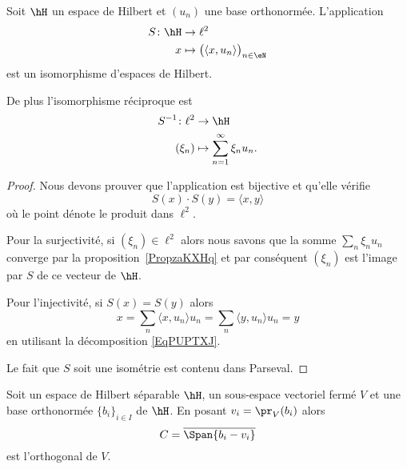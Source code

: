 \begin{corollary}       \label{CorQETwUdF}
	Soit \( \hH\) un espace de Hilbert et \( (u_n)\) une base orthonormée. L'application
	\begin{equation}
		\begin{aligned}
			S\colon \hH & \to \ell^2                                            \\
			x           & \mapsto \big( \langle x, u_n\rangle  \big)_{n\in \eN}
		\end{aligned}
	\end{equation}
	est un isomorphisme d'espaces de Hilbert.

	De plus l'isomorphisme réciproque est
	\begin{equation}
		\begin{aligned}
			S^{-1}\colon \ell^2 & \to \hH                              \\
			(\xi_n)             & \mapsto \sum_{n=1}^{\infty}\xi_nu_n.
		\end{aligned}
	\end{equation}
\end{corollary}

\begin{proof}
	Nous devons prouver que l'application est bijective et qu'elle vérifie
	\begin{equation}
		S(x)\cdot S(y)=\langle x, y\rangle
	\end{equation}
	où le point dénote le produit dans \( \ell^2\).

	Pour la surjectivité, si \( (\xi_n)\in \ell^2\) alors nous savons que la somme \( \sum_n\xi_nu_n\) converge par la proposition~\ref{PropzaKXHq} et par conséquent \( (\xi_n)\) est l'image par \( S\) de ce vecteur de \( \hH\).

	Pour l'injectivité, si \( S(x)=S(y)\) alors
	\begin{equation}
		x=\sum_n\langle x, u_n\rangle u_n=\sum_n\langle y, u_n\rangle u_n=y
	\end{equation}
	en utilisant la décomposition \eqref{EqPUPTXJ}.

	Le fait que \( S\) soit une isométrie est contenu dans Parseval.
\end{proof}

\begin{proposition}      \label{PROPooPVQIooPcEFSe}
	Soit un espace de Hilbert séparable \( \hH\), un sous-espace vectoriel fermé \( V\) et une base orthonormée \( \{ b_i \}_{i\in I}\) de \( \hH\). En posant \( v_i=\pr_V(b_i)\) alors
	\begin{equation}
		C=\overline{ \Span\{ b_i-v_i \} }
	\end{equation}
	est l'orthogonal de \( V\).
\end{proposition}

